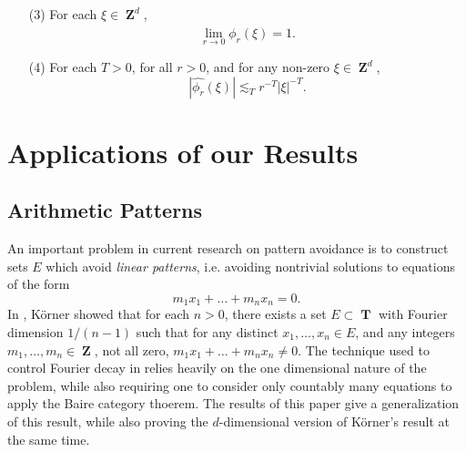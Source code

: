 \documentclass[dvipsnames,letterpaper,12pt]{article}
\numberwithin{equation}{section}
\DeclareMathOperator{\ZZ}{\mathbf{Z}}
\DeclareMathOperator{\TT}{\mathbf{T}}
\numberwithin{theorem}{section}
\begin{document}
\begin{itemize}
\begin{enumerate}

    \item[(3)] For each $\xi \in \ZZ^d$,
    \begin{equation} \label{approximationtoidentitypointwiseconvergence}
        \lim_{r \to 0} \widehat{\phi_r}(\xi) = 1.
    \end{equation}

    \item[(4)] For each $T > 0$, for all $r > 0$, and for any non-zero $\xi \in \ZZ^d$,
    \begin{equation} \label{molificationdecaybound}
        |\widehat{\phi_r}(\xi)| \lesssim_T r^{-T} |\xi|^{-T}.
    \end{equation}
\end{enumerate}
\end{itemize}




\section{Applications of our Results}

\subsection{Arithmetic Patterns}

An important problem in current research on pattern avoidance is to construct sets $E$ which avoid \emph{linear patterns}, i.e. avoiding nontrivial solutions to equations of the form
%
\[ m_1x_1 + \dots + m_nx_n = 0. \]
%
In \cite{Korner2}, K\"{o}rner showed that for each $n > 0$, there exists a set $E \subset \TT$ with Fourier dimension $1/(n-1)$ such that for any distinct $x_1,\dots,x_n \in E$, and any integers $m_1,\dots,m_n \in \ZZ$, not all zero, $m_1x_1 + \dots + m_nx_n \neq 0$. The technique used to control Fourier decay in \cite{Korner2} relies heavily on the one dimensional nature of the problem, while also requiring one to consider only countably many equations to apply the Baire category thoerem. The results of this paper give a generalization of this result, while also proving the $d$-dimensional version of K\"{o}rner's result at the same time.
\end{document}
